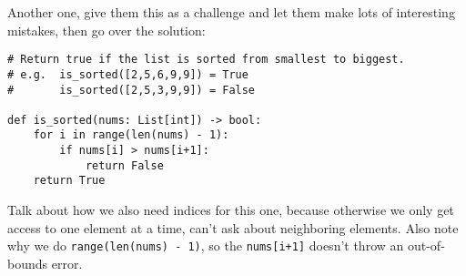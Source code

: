 \documentclass{article}
\begin{document}
Another one, give them this as a challenge and let them make lots of
interesting mistakes, then go over the solution:
\begin{verbatim}
# Return true if the list is sorted from smallest to biggest.
# e.g.  is_sorted([2,5,6,9,9]) = True
#       is_sorted([2,5,3,9,9]) = False

def is_sorted(nums: List[int]) -> bool:
    for i in range(len(nums) - 1):
        if nums[i] > nums[i+1]:
            return False
    return True
\end{verbatim}

Talk about how we also need indices for this one, because otherwise we
only get access to one element at a time, can't ask about neighboring
elements.  Also note why we do \verb|range(len(nums) - 1)|, so the
\verb|nums[i+1]| doesn't throw an out-of-bounds error.












\end{document}
